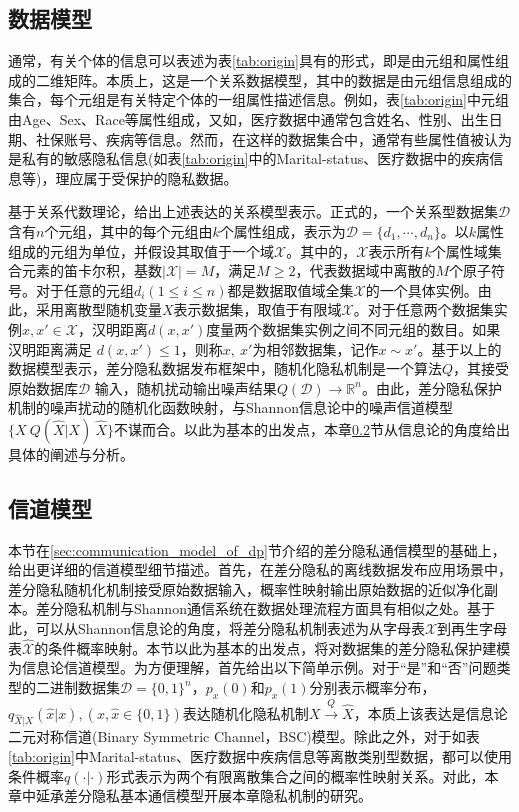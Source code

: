 \subsection{数据模型}
通常，有关个体的信息可以表述为表\ref{tab:origin}具有的形式，即是由元组和属性组成的二维矩阵。本质上，这是一个关系数据模型，其中的数据是由元组信息组成的集合，每个元组是有关特定个体的一组属性描述信息。例如，表\ref{tab:origin}中元组由Age、Sex、Race等属性组成，又如，医疗数据中通常包含姓名、性别、出生日期、社保账号、疾病等信息。然而，在这样的数据集合中，通常有些属性值被认为是私有的敏感隐私信息(如表\ref{tab:origin}中的Marital-status、医疗数据中的疾病信息等)，理应属于受保护的隐私数据。

基于关系代数理论，给出上述表达的关系模型表示。正式的，一个关系型数据集$\mathcal{D}$含有$n$个元组，其中的每个元组由$k$个属性组成，表示为$\mathcal{D}=\{d_1,\cdots,d_n\}$。以$k$属性组成的元组为单位，并假设其取值于一个域$\mathcal{X}$。其中的，$\mathcal{X}$表示所有$k$个属性域集合元素的笛卡尔积，基数$|\mathcal{X}|=M$，满足$M \geq 2$，代表数据域中离散的$M$个原子符号。对于任意的元组$d_i(1\leq i \leq n)$都是数据取值域全集$\mathcal{X}$的一个具体实例。由此，采用离散型随机变量$X$表示数据集，取值于有限域$\mathcal{X}$。对于任意两个数据集实例$x,x' \in \mathcal{X}$，汉明距离$d(x,x')$度量两个数据集实例之间不同元组的数目。如果汉明距离满足 $d(x,x')\leq 1$，则称$x,~x'$为相邻数据集，记作$x\sim x'$。基于以上的数据模型表示，差分隐私数据发布框架中，随机化隐私机制是一个算法$Q$，其接受原始数据库$\mathcal{D}$
输入，随机扰动输出噪声结果$Q(\mathcal{D})\rightarrow \mathbb{R}^{n}$\cite{dwork2014algorithmic}。由此，差分隐私保护机制的噪声扰动的随机化函数映射，与Shannon信息论中的噪声信道模型$\{X~Q(\hat{X}|X)~\hat{X}\}$\cite{xiong2016randomized,alvim2011differential}不谋而合。以此为基本的出发点，本章\ref{chapter05-achieve-channel}节从信息论的角度给出具体的阐述与分析。

\subsection{信道模型}\label{chapter05-achieve-channel}

本节在\ref{sec:communication_model_of_dp}节介绍的差分隐私通信模型的基础上，给出更详细的信道模型细节描述。首先，在差分隐私的离线数据发布应用场景中，差分隐私随机化机制接受原始数据输入，概率性映射输出原始数据的近似净化副本。差分隐私机制与Shannon通信系统在数据处理流程方面具有相似之处。基于此，可以从Shannon信息论的角度，将差分隐私机制表述为从字母表$\mathcal{X}$到再生字母表$\mathcal{\hat{X}}$的条件概率映射。本节以此为基本的出发点，将对数据集的差分隐私保护建模为信息论信道模型。为方便理解，首先给出以下简单示例。对于``是''和``否''问题类型的二进制数据集$\mathcal{D}=\{0,1\}^{n}$，$p_x(0)$和$p_x(1)$分别表示概率分布，$q_{\hat{X}|X}(\hat{x}|x),(x,\hat{x}\in \{0,1\})$表达随机化隐私机制$X\xrightarrow{Q} \hat{X}$，本质上该表达是信息论二元对称信道(Binary Symmetric Channel，BSC)模型。除此之外，对于如表\ref{tab:origin}中Marital-status、医疗数据中疾病信息等离散类别型数据，都可以使用条件概率$q(\cdot|\cdot)$形式表示为两个有限离散集合之间的概率性映射关系。对此，本章中延承差分隐私基本通信模型开展本章隐私机制的研究。

